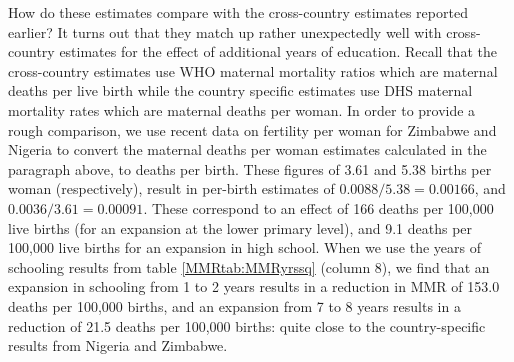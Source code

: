 \documentclass{article}[12pt,subeqn]
\begin{document}
\begin{spacing}{1.4}
How do these estimates compare with the cross-country estimates reported earlier? 
It turns out that they match up rather unexpectedly well with cross-country 
estimates for the effect of additional years of education. Recall that the 
cross-country estimates use WHO maternal mortality ratios which are maternal 
deaths per live birth while the country specific estimates use DHS maternal 
mortality rates which are maternal deaths per woman.  In order to provide a rough 
comparison, we use recent data \citep{CIA2012} on fertility per woman for Zimbabwe 
and Nigeria to convert the maternal deaths per woman estimates calculated in the 
paragraph above, to deaths per birth.  These figures of 3.61 and 5.38 births per 
woman (respectively), result in per-birth estimates of $0.0088/5.38=0.00166$, and 
$0.0036/3.61=0.00091$.  These correspond to an effect of 166 deaths per 100,000 
live births (for an expansion at the lower primary level), and 9.1 deaths per 
100,000 live births for an expansion in high school. When we use the years of 
schooling results from table \ref{MMRtab:MMRyrssq} (column 8), we find that an 
expansion in schooling from 1 to 2 years results in a reduction in MMR of 153.0 
deaths per 100,000 births, and an expansion from 7 to 8 years results in a 
reduction of 21.5 deaths per 100,000 births: quite close to the country-specific 
results from Nigeria and Zimbabwe.


\end{spacing}
\end{document}

